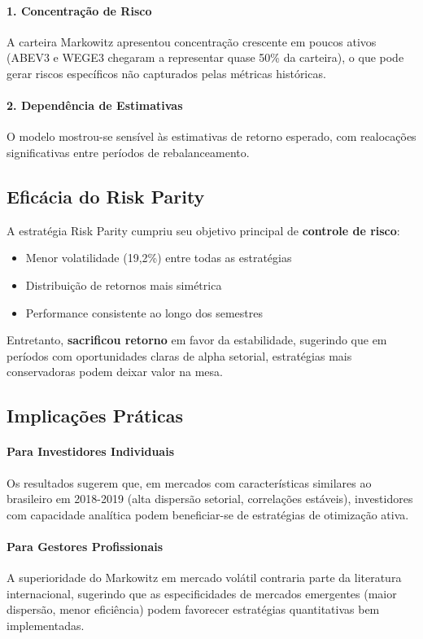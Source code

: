 \paragraph{1. Concentração de Risco}
A carteira Markowitz apresentou concentração crescente em poucos ativos (ABEV3 e WEGE3 chegaram a representar quase 50\% da carteira), o que pode gerar riscos específicos não capturados pelas métricas históricas.

\paragraph{2. Dependência de Estimativas}
O modelo mostrou-se sensível às estimativas de retorno esperado, com realocações significativas entre períodos de rebalanceamento.

\subsection{Eficácia do Risk Parity}

A estratégia Risk Parity cumpriu seu objetivo principal de \textbf{controle de risco}:

\begin{itemize}
    \item Menor volatilidade (19,2\%) entre todas as estratégias
    \item Distribuição de retornos mais simétrica
    \item Performance consistente ao longo dos semestres
\end{itemize}

Entretanto, \textbf{sacrificou retorno} em favor da estabilidade, sugerindo que em períodos com oportunidades claras de alpha setorial, estratégias mais conservadoras podem deixar valor na mesa.

\subsection{Implicações Práticas}

\paragraph{Para Investidores Individuais}
Os resultados sugerem que, em mercados com características similares ao brasileiro em 2018-2019 (alta dispersão setorial, correlações estáveis), investidores com capacidade analítica podem beneficiar-se de estratégias de otimização ativa.

\paragraph{Para Gestores Profissionais}
A superioridade do Markowitz em mercado volátil contraria parte da literatura internacional, sugerindo que as especificidades de mercados emergentes (maior dispersão, menor eficiência) podem favorecer estratégias quantitativas bem implementadas.

